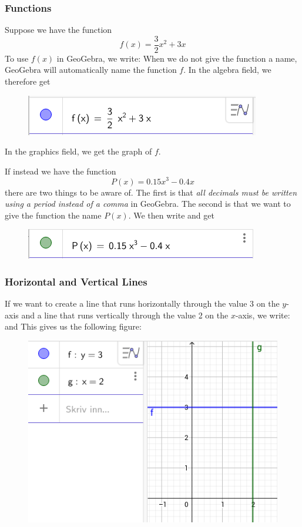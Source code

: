 \subsubsection{Functions}
Suppose we have the function 
\[f(x)= \frac{3}{2} x^2 + 3x \]
To use $ f(x) $ in GeoGebra, we write:
When we do not give the function a name, GeoGebra will automatically name the function $ f $. In the algebra field, we therefore get
\begin{figure}[H]
	\centering
	\includegraphics[scale=0.5]{skrivf}
\end{figure}
In the graphics field, we get the graph of $ f $. \vsk

If instead we have the function
\[ P(x)= 0.15x^3 - 0.4 x\]
there are two things to be aware of. The first is that \textsl{all decimals must be written using a period instead of a comma} in GeoGebra. The second is that we want to give the function the name $ P(x) $. We then write
and get \vspace{-5pt}
\begin{figure}[H]
	\centering
	\includegraphics[scale=0.5]{pfig}
\end{figure}

\subsubsection{Horizontal and Vertical Lines}

If we want to create a line that runs horizontally through the value 3 on the \(y\)-axis and a line that runs vertically through the value 2 on the \(x\)-axis, we write:
and 
This gives us the following figure:
\begin{figure}[H]
	\centering
	\includegraphics[scale=0.5]{23}
\end{figure}


